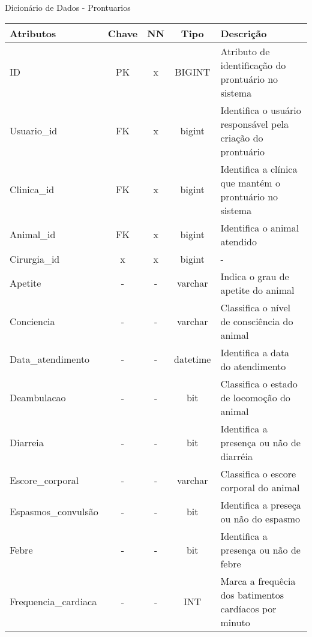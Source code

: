 \documentclass[
    12pt,               %
    openright,          %
    oneside,
    a4paper,            %
    BIBLATEX,           %
    TODO,               %
    english,            %
    brazil              %
    ]{ifsp-spo-inf-ctds}
\begin{document}
            \begin{center}
                \begin{quadro}[H]

                  \caption{Dicionário de Dados - Prontuarios}
                  \begin{tabulary}{1.0\textwidth}{|p{11em}|c|c|c|p{17em}|}
                  \hline
                  Atributos & Chave & NN & Tipo & Descrição\\
                  \hline
                  ID & PK & x & BIGINT & Atributo de identificação do prontuário no sistema \\
                  \hline
                  Usuario\_id & FK & x & bigint & Identifica o usuário responsável pela criação do prontuário \\
                  \hline
                  Clinica\_id & FK & x & bigint & Identifica a clínica que mantém o prontuário no sistema\\
                  \hline
                  Animal\_id & FK & x & bigint & Identifica o animal atendido \\
                  \hline
                  Cirurgia\_id & x & x & bigint & -\\
                  \hline
                  Apetite & - & - & varchar & Indica o grau de apetite do animal\\
                  \hline
                  Conciencia & - & - & varchar & Classifica o nível de consciência do animal\\
                  \hline
                  Data\_atendimento & - & - & datetime & Identifica a data do atendimento\\
                  \hline
                  Deambulacao & - & - & bit & Classifica o estado de locomoção do animal\\
                  \hline
                  Diarreia & - & - & bit & Identifica a presença ou não de diarréia\\
                  \hline
                  Escore\_corporal & - & - & varchar & Classifica o escore corporal do animal\\
                  \hline
                  Espasmos\_convulsão  & - & - & bit &  Identifica a preseça ou não do espasmo\\
                  \hline
                  Febre & - & - & bit & Identifica a presença ou não de febre \\
                  \hline
                  Frequencia\_cardiaca & - & - & INT & Marca a frequêcia dos batimentos cardíacos por minuto\\

\end{tabulary}
\end{quadro}
\end{center}
\end{document}
